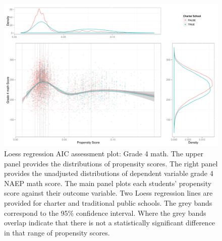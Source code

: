 \begin{figure}[h!]
\begin{center}
\includegraphics{../Figures2009/g4math-loessAIC.pdf}
\caption[Loess regression AIC assessment plot: Grade 4 math]{Loess regression AIC assessment plot: Grade 4 math. The upper panel provides the distributions of propensity scores. The right panel provides the unadjusted distributions of dependent variable grade 4 NAEP math score. The main panel plots each students' propensity score against their outcome variable. Two Loess regression lines are provided for charter and traditional public schools. The grey bands correspond to the 95\% confidence interval. Where the grey bands overlap indicate that there is not a statistically significant difference in that range of propensity scores.}
\label{fig:g4math:loessAIC}
\end{center}
\end{figure}

